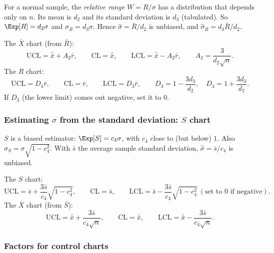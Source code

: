 For a normal sample, the \emph{relative range} $W=R/\sigma$ has a distribution that depends only on $n$. Its mean is $d_2$ and its standard deviation is $d_3$ (tabulated). So $\Exp[R]=d_2\sigma$ and $\sigma_R=d_3\sigma$. Hence $\hat\sigma=\bar{R}/d_2$ is unbiased, and $\hat\sigma_R=d_3\bar{R}/d_2$.

\begin{theorem}\label{thm:xbarR}
The $\bar{X}$ chart (from $\bar{R}$):
\[ \mathrm{UCL}=\bar{\bar{x}}+A_2\bar{r},\qquad\mathrm{CL}=\bar{\bar{x}},\qquad\mathrm{LCL}=\bar{\bar{x}}-A_2\bar{r},\qquad A_2=\frac3{d_2\sqrt n}. \]
The $R$ chart:
\[ \mathrm{UCL}=D_4\bar{r},\qquad\mathrm{CL}=\bar{r},\qquad\mathrm{LCL}=D_3\bar{r},\qquad D_3=1-\frac{3d_3}{d_2},\quad D_4=1+\frac{3d_3}{d_2}. \]
If $D_3$ (the lower limit) comes out negative, set it to $0$.
\end{theorem}

\subsubsection*{Estimating $\sigma$ from the standard deviation: $S$ chart}

$S$ is a biased estimator: $\Exp[S]=c_4\sigma$, with $c_4$ close to (but below) $1$. Also $\sigma_S=\sigma\sqrt{1-c_4^2}$. With $\bar{s}$ the average sample standard deviation, $\hat\sigma=\bar{s}/c_4$ is unbiased.

\begin{theorem}\label{thm:xbarS}
The $S$ chart:
\[ \mathrm{UCL}=\bar{s}+\frac{3\bar{s}}{c_4}\sqrt{1-c_4^2},\qquad\mathrm{CL}=\bar{s},\qquad\mathrm{LCL}=\bar{s}-\frac{3\bar{s}}{c_4}\sqrt{1-c_4^2}\ (\text{set to }0\text{ if negative}). \]
The $\bar{X}$ chart (from $\bar{S}$):
\[ \mathrm{UCL}=\bar{\bar{x}}+\frac{3\bar{s}}{c_4\sqrt n},\qquad\mathrm{CL}=\bar{\bar{x}},\qquad\mathrm{LCL}=\bar{\bar{x}}-\frac{3\bar{s}}{c_4\sqrt n}. \]
\end{theorem}

\subsubsection*{Factors for control charts}

